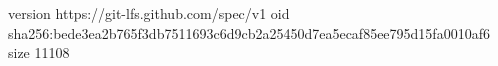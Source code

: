 version https://git-lfs.github.com/spec/v1
oid sha256:bede3ea2b765f3db7511693c6d9cb2a25450d7ea5ecaf85ee795d15fa0010af6
size 11108
